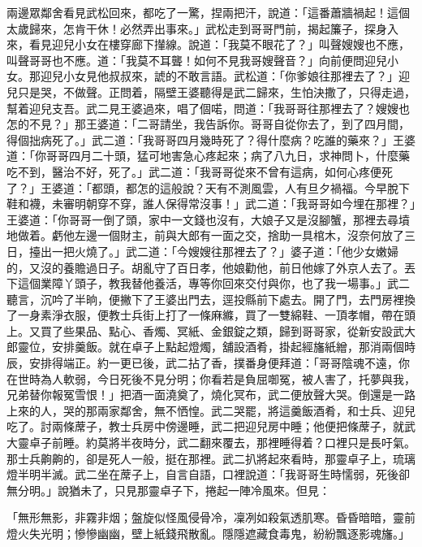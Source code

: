 兩邊眾鄰舍看見武松回來，都吃了一驚，捏兩把汗，說道：「這番蕭牆禍起！這個太歲歸來，怎肯干休！必然弄出事來。」武松走到哥哥門前，揭起簾子，探身入來，看見迎兒小女在樓穿廊下攆線。說道：「我莫不眼花了？」叫聲嫂嫂也不應，叫聲哥哥也不應。道：「我莫不耳聾！如何不見我哥嫂聲音？」向前便問迎兒小女。那迎兒小女見他叔叔來，諕的不敢言語。武松道：「你爹娘往那裡去了？」迎兒只是哭，不做聲。正問着，隔壁王婆聽得是武二歸來，生怕決撒了，只得走過，幫着迎兒支吾。武二見王婆過來，唱了個喏，問道：「我哥哥往那裡去了？嫂嫂也怎的不見？」那王婆道：「二哥請坐，我告訴你。哥哥自從你去了，到了四月間，得個拙病死了。」武二道：「我哥哥四月幾時死了？得什麼病？吃誰的藥來？」王婆道：「你哥哥四月二十頭，猛可地害急心疼起來；病了八九日，求神問卜，什麼藥吃不到，醫治不好，死了。」武二道：「我哥哥從來不曾有這病，如何心疼便死了？」王婆道：「都頭，都怎的這般說？天有不測風雲，人有旦夕禍福。今早脫下鞋和襪，未審明朝穿不穿，誰人保得常沒事！」武二道：「我哥哥如今埋在那裡？」王婆道：「你哥哥一倒了頭，家中一文錢也沒有，大娘子又是沒腳蟹，那裡去尋墳地做着。虧他左邊一個財主，前與大郎有一面之交，捨助一具棺木，沒奈何放了三日，擡出一把火燒了。」武二道：「今嫂嫂往那裡去了？」婆子道：「他少女嫩婦的，又沒的養贍過日子。胡亂守了百日孝，他娘勸他，前日他嫁了外京人去了。丟下這個業障丫頭子，教我替他養活，專等你回來交付與你，也了我一場事。」武二聽言，沉吟了半晌，便撇下了王婆出門去，逕投縣前下處去。開了門，去門房裡換了一身素淨衣服，便教士兵街上打了一條麻縧，買了一雙綿鞋、一頂孝帽，帶在頭上。又買了些果品、點心、香燭、冥紙、金銀錠之類，歸到哥哥家，從新安設武大郎靈位，安排羹飯。就在卓子上點起燈燭，舖設酒肴，掛起經旛紙繒，那消兩個時辰，安排得端正。約一更已後，武二拈了香，撲番身便拜道：「哥哥陰魂不遠，你在世時為人軟弱，今日死後不見分明；你看若是負屈啣冤，被人害了，托夢與我，兄弟替你報冤雪恨！」把酒一面澆奠了，燒化冥布，武二便放聲大哭。倒還是一路上來的人，哭的那兩家鄰舍，無不恓惶。武二哭罷，將這羹飯酒肴，和士兵、迎兒吃了。討兩條蓆子，教士兵房中傍邊睡，武二把迎兒房中睡；他便把條蓆子，就武大靈卓子前睡。約莫將半夜時分，武二翻來覆去，那裡睡得着？口裡只是長吁氣。那士兵齁齁的，卻是死人一般，挺在那裡。武二扒將起來看時，那靈卓子上，琉璃燈半明半滅。武二坐在蓆子上，自言自語，口裡說道：「我哥哥生時懦弱，死後卻無分明。」說猶未了，只見那靈卓子下，捲起一陣冷風來。但見：

「無形無影，非霧非烟；盤旋似怪風侵骨冷，凜冽如殺氣透肌寒。昏昏暗暗，靈前燈火失光明；慘慘幽幽，壁上紙錢飛散亂。隱隱遮藏食毒鬼，紛紛飄逐影魂旛。」


